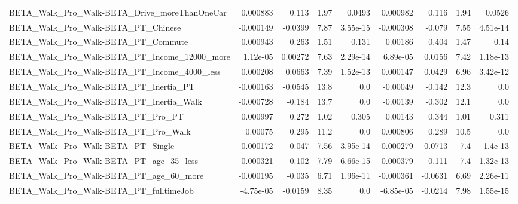 \begin{tabular}{lrrrrrrrr}
BETA\_Walk\_Pro\_Walk-BETA\_Drive\_moreThanOneCar       &    0.000883 &        0.113 &     1.97 &   0.0493 &   0.000982 &       0.116 &         1.94 &        0.0526 \\
BETA\_Walk\_Pro\_Walk-BETA\_PT\_Chinese                 &   -0.000149 &      -0.0399 &     7.87 & 3.55e-15 &  -0.000308 &      -0.079 &         7.55 &      4.51e-14 \\
BETA\_Walk\_Pro\_Walk-BETA\_PT\_Commute                 &    0.000943 &        0.263 &     1.51 &    0.131 &    0.00186 &       0.404 &         1.47 &          0.14 \\
BETA\_Walk\_Pro\_Walk-BETA\_PT\_Income\_12000\_more       &    1.12e-05 &      0.00272 &     7.63 & 2.29e-14 &   6.89e-05 &      0.0156 &         7.42 &      1.18e-13 \\
BETA\_Walk\_Pro\_Walk-BETA\_PT\_Income\_4000\_less        &    0.000208 &       0.0663 &     7.39 & 1.52e-13 &   0.000147 &      0.0429 &         6.96 &      3.42e-12 \\
BETA\_Walk\_Pro\_Walk-BETA\_PT\_Inertia\_PT              &   -0.000163 &      -0.0545 &     13.8 &      0.0 &   -0.00049 &      -0.142 &         12.3 &           0.0 \\
BETA\_Walk\_Pro\_Walk-BETA\_PT\_Inertia\_Walk            &   -0.000728 &       -0.184 &     13.7 &      0.0 &   -0.00139 &      -0.302 &         12.1 &           0.0 \\
BETA\_Walk\_Pro\_Walk-BETA\_PT\_Pro\_PT                  &    0.000997 &        0.272 &     1.02 &    0.305 &    0.00143 &       0.344 &         1.01 &         0.311 \\
BETA\_Walk\_Pro\_Walk-BETA\_PT\_Pro\_Walk                &     0.00075 &        0.295 &     11.2 &      0.0 &   0.000806 &       0.289 &         10.5 &           0.0 \\
BETA\_Walk\_Pro\_Walk-BETA\_PT\_Single                  &    0.000172 &        0.047 &     7.56 & 3.95e-14 &   0.000279 &      0.0713 &          7.4 &       1.4e-13 \\
BETA\_Walk\_Pro\_Walk-BETA\_PT\_age\_35\_less             &   -0.000321 &       -0.102 &     7.79 & 6.66e-15 &  -0.000379 &      -0.111 &          7.4 &      1.32e-13 \\
BETA\_Walk\_Pro\_Walk-BETA\_PT\_age\_60\_more             &   -0.000195 &       -0.035 &     6.71 & 1.96e-11 &  -0.000361 &     -0.0631 &         6.69 &      2.26e-11 \\
BETA\_Walk\_Pro\_Walk-BETA\_PT\_fulltimeJob             &   -4.75e-05 &      -0.0159 &     8.35 &      0.0 &  -6.85e-05 &     -0.0214 &         7.98 &      1.55e-15 \\

\end{tabular}
